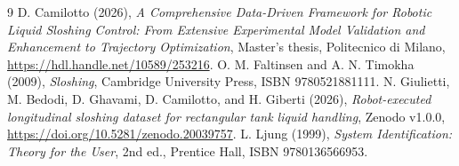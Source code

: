 \documentclass[10pt,a4paper]{article}
\begin{document}
\begin{thebibliography}{9}
 D. Camilotto (2026), \emph{A Comprehensive Data-Driven Framework for Robotic Liquid Sloshing Control: From Extensive Experimental Model Validation and Enhancement to Trajectory Optimization}, Master's thesis, Politecnico di Milano, \url{https://hdl.handle.net/10589/253216}.
 O. M. Faltinsen and A. N. Timokha (2009), \emph{Sloshing}, Cambridge University Press, ISBN 9780521881111.
 N. Giulietti, M. Bedodi, D. Ghavami, D. Camilotto, and H. Giberti (2026), \emph{Robot-executed longitudinal sloshing dataset for rectangular tank liquid handling}, Zenodo v1.0.0, \url{https://doi.org/10.5281/zenodo.20039757}.
 L. Ljung (1999), \emph{System Identification: Theory for the User}, 2nd ed., Prentice Hall, ISBN 9780136566953.
\end{thebibliography}
\end{document}

